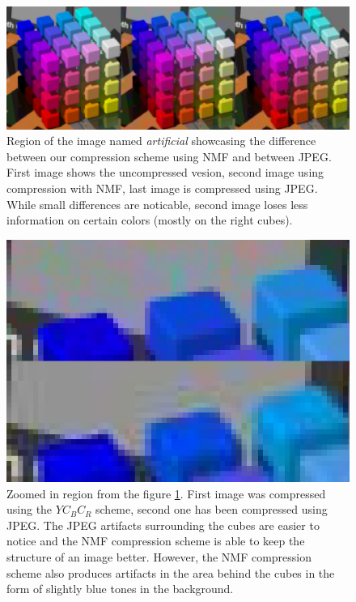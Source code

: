\documentclass[thesis=M,english]{FITthesis}[2012/10/20]
\begin{document}
\begin{figure}
  \centering
  \includegraphics[scale=0.33]{imgs/results/nmfvsjpgartifacts}
  \caption{Region of the image named \emph{artificial} showcasing the difference
           between our compression scheme using NMF and between JPEG. First image
           shows the uncompressed vesion, second image using compression with NMF,
           last image is compressed using JPEG. While small differences are
           noticable, second image loses less information on certain colors (mostly
           on the right cubes).}
  \label{fig:nmfvsjpgartifacts}
\end{figure}

\begin{figure}
  \centering
  \includegraphics[scale=0.5]{imgs/results/nmfjpgzoom}
  \caption{Zoomed in region from the figure \ref{fig:nmfvsjpgartifacts}. First image
           was compressed using the $YC_BC_R$ scheme, second one has been compressed
           using JPEG. The JPEG artifacts surrounding the cubes are easier to notice
           and the NMF compression scheme is able to keep the structure of an image
           better. However, the NMF compression scheme also produces artifacts in the
           area behind the cubes in the form of slightly blue tones in the background.}
  \label{fig:nmfvsjpgzoom}
\end{figure}
\end{document}
